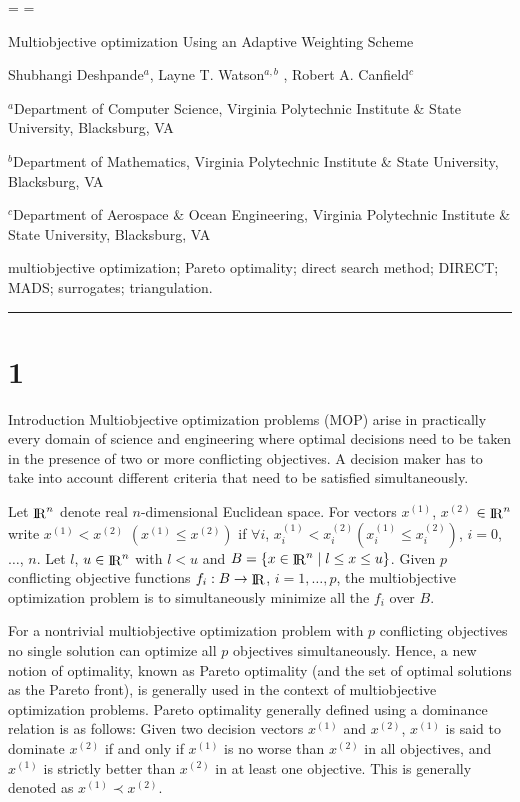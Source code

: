 \rn \AD
\rn \ASZ
\rn \ASZI
\rn \C
\rn \D
\rn \DD
\rn \DPAM
\rn \DT
\rn \DWC
\rn \E
\rn \GF
\rn \GSG
\rn \HWRSVJBT
\rn \JPS
\rn \KWT
\rn \MM
\rn \RKW
\rn \TZWBIB
\rn \VL
\rn \WCSF
\rn \WIHM

\headline={\hfil}
\footline={\hfil}

\centerline{\bfXIV Multiobjective optimization Using an Adaptive Weighting Scheme}
\vskip 1.2pc
\centerline{\rmXII Shubhangi Deshpande{$^a$}, Layne T. Watson{$^{a,b}$
}, Robert A. Canfield$^c$}
\smallskip
\centerline{\rmVIII $^a$Department of Computer Science, Virginia Polytechnic 
Institute \& State University, Blacksburg, VA}
\centerline{\rmVIII $^b$Department of Mathematics, Virginia Polytechnic 
Institute \& State University, Blacksburg, VA}
\centerline{\rmVIII $^c$Department of Aerospace \& Ocean Engineering, Virginia 
Polytechnic Institute \& State University, Blacksburg, VA}
\bigskip

\smallskip
\noindent 
\bigskip{} multiobjective optimization; Pareto 
optimality; direct search method; DIRECT; MADS; surrogates; triangulation.
\smallskip
\hrule
\smallskip
%
%

\section{1}{Introduction}%
Multiobjective optimization problems (MOP) arise in practically every domain 
of science and engineering where optimal decisions need to be taken in 
the presence of two or more conflicting objectives. A decision maker has to 
take into account different criteria that need to be satisfied
simultaneously.

Let $\mathop{\rm I}\!\!\mathop{\rm R}\nolimits^n$ denote real $n$-dimensional Euclidean space. For vectors $x^{(1)}$, 
$x^{(2)}$ $\in \mathop{\rm I}\!\!\mathop{\rm R}\nolimits^n$ write $x^{(1)} < x^{(2)}$ $(x^{(1)}\le x^{(2)})$ if 
$\forall i$, $x^{(1)}_i<x^{(2)}_i (x^{(1)}_i\le x^{(2)}_i)$, $i=0$, $\ldots$, 
$n$. Let $l$, $u \in \mathop{\rm I}\!\!\mathop{\rm R}\nolimits^n$ with $l < u$ and $B = \{ x \in \mathop{\rm I}\!\!\mathop{\rm R}\nolimits^n \mid l\le x\le 
u\}$. Given $p$ conflicting objective functions $f_i: B \to \mathop{\rm I}\!\!\mathop{\rm R}\nolimits$, $i=1,\ldots,p$, 
the multiobjective optimization problem is to simultaneously minimize all the 
$f_i$ over $B$.

For a nontrivial multiobjective optimization problem with $p$ conflicting 
objectives no single solution can optimize all $p$ objectives simultaneously. 
Hence, a new notion of optimality, known as Pareto optimality (and the set of 
optimal solutions as the Pareto front), is generally used in the context of
multiobjective optimization problems. Pareto optimality generally defined using
a dominance relation is as follows: Given two decision vectors $x^{(1)}$ and
$x^{(2)}$, $x^{(1)}$ is said to dominate $x^{(2)}$ if and only if $x^{(1)}$ is
no worse than $x^{(2)}$ in all objectives, and $x^{(1)}$ is strictly better
than $x^{(2)}$ in at least one objective. This is generally denoted as
$x^{(1)}\prec x^{(2)}$.


